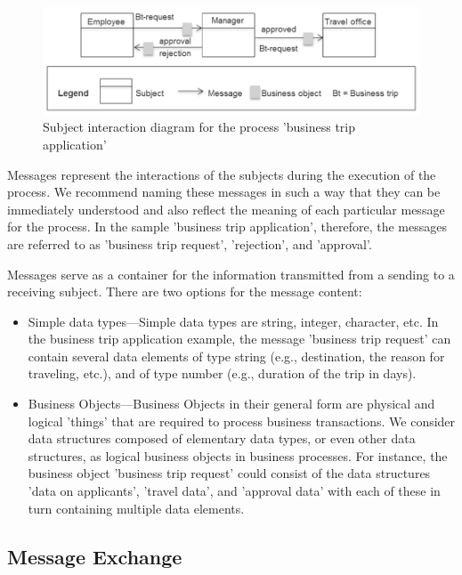 \begin{figure}[htbp]
	\centering
	\includegraphics[width=14cm]{Figures/Ontology/SubjectInteraction/Beispiel-Subject-Interaction.png}
	\caption[Subject interaction diagram]{Subject interaction diagram for the process 'business trip application'}
	\label{fig:beispiel-SubjectInteraction}
\end{figure}

Messages represent the interactions of the subjects during the execution of the process. We recommend naming these messages in such a way that they can be immediately understood and also reflect the meaning of each particular message for the process. In the sample 'business trip application', therefore, the messages are referred to as 'business trip request', 'rejection', and 'approval'.

Messages serve as a container for the information transmitted from a sending to a receiving subject. There are two options for the message content:

\begin{itemize}
	\item     Simple data types---Simple data types are string, integer, character, etc. In the business trip application example, the message 'business trip request' can contain several data elements of type string (e.g., destination, the reason for traveling, etc.), and of type number (e.g., duration of the trip in days).
	\item Business Objects---Business Objects in their general form are physical and logical 'things' that are required to process business transactions. We consider data structures composed of elementary data types, or even other data structures, as logical business objects in business processes. For instance, the business object 'business trip request' could consist of the data structures 'data on applicants', 'travel data', and 'approval data' with each of these in turn containing multiple data elements.
\end{itemize}

\subsection{Message Exchange}

